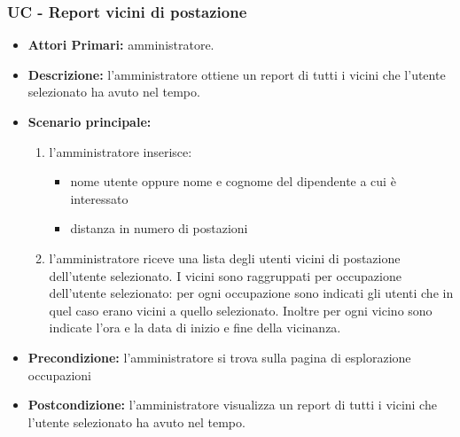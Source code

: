 \subsubsection{ UC - Report vicini di postazione}
\begin{itemize}
	\item\textbf{Attori Primari:} 
	amministratore.
	\item\textbf{Descrizione:} 
	l'amministratore ottiene un report di tutti i vicini che l'utente selezionato ha avuto nel tempo.
	\item\textbf{Scenario principale:} 
	\begin{enumerate}
		\item l'amministratore inserisce:
		\begin{itemize}
			\item nome utente oppure nome e cognome del dipendente a cui è interessato
			\item distanza in numero di postazioni
		\end{itemize}
		\item l'amministratore riceve una lista degli utenti vicini di postazione dell'utente selezionato. I vicini sono raggruppati per occupazione dell'utente selezionato: per ogni occupazione sono indicati gli utenti che in quel caso erano vicini a quello selezionato. Inoltre per ogni vicino sono indicate l'ora e la data di inizio e fine della vicinanza.
	\end{enumerate}
	\item\textbf{Precondizione:} 
	l'amministratore si trova sulla pagina di esplorazione occupazioni
	\item\textbf{Postcondizione:}
	l'amministratore visualizza un report di tutti i vicini che l'utente selezionato ha avuto nel tempo.
\end{itemize}


